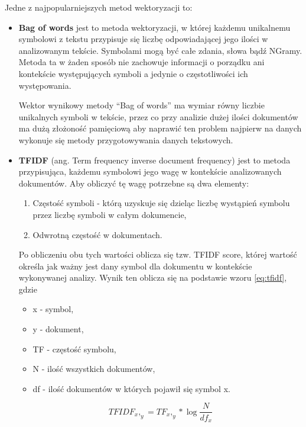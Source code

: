 Jedne z najpopularniejszych metod wektoryzacji to: ~\cite{ML}
\begin{itemize}
    \item \textbf{Bag of words} jest to metoda wektoryzacji, w której każdemu unikalnemu symbolowi z tekstu przypisuje się liczbę 
    odpowiadającej jego ilości w analizowanym tekście. Symbolami mogą być całe zdania, słowa bądź NGramy. 
    Metoda ta w żaden sposób nie zachowuje informacji o porządku ani kontekście występujących symboli a jedynie o 
    częstotliwości ich występowania. 
    
    Wektor wynikowy metody ``Bag of words'' ma wymiar równy liczbie unikalnych symboli w tekście, przez co przy analizie dużej ilości 
    dokumentów ma dużą złożoność pamięciową aby naprawić ten problem najpierw na danych wykonuje się metody przygotowywania danych tekstowych.

    \item \textbf{TFIDF} (ang. Term frequency inverse document frequency) jest to metoda przypisująca, każdemu symbolowi 
    jego wagę w kontekście analizowanych dokumentów. Aby obliczyć tę wagę potrzebne są dwa elementy:
    \begin{enumerate}
        \item Częstość symboli - którą uzyskuje się dzieląc liczbę wystąpień symbolu przez liczbę symboli w całym dokumencie,
        \item Odwrotną częstość w dokumentach.
    \end{enumerate}
    Po obliczeniu obu tych wartości oblicza się tzw. TFIDF score, której wartość określa jak ważny jest dany symbol 
    dla dokumentu w kontekście wykonywanej analizy. Wynik ten oblicza się na podstawie wzoru \ref{eq:tfidf}, gdzie
    \begin{itemize}
        \item x - symbol,
        \item y - dokument,
        \item TF - częstość symbolu,
        \item N - ilość wszystkich dokumentów,
        \item df - ilość dokumentów w których pojawił się symbol x.
    \end{itemize}

    \begin{equation}
        \label{eq:tfidf}
        TFIDF_x,_y = TF_x,_y* \log{\frac{N}{df_x}}
    \end{equation}
\end{itemize}